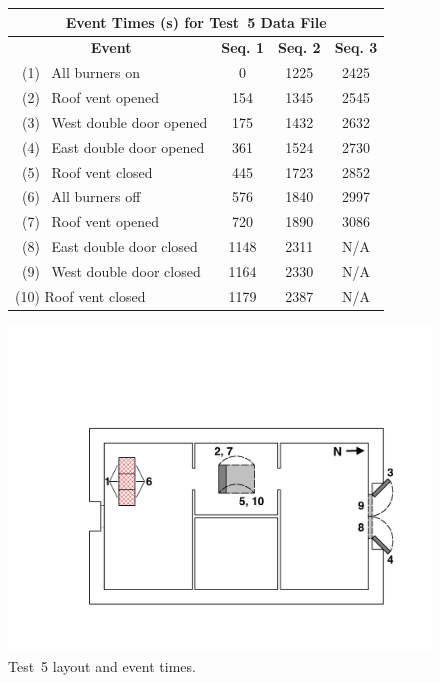 \documentclass[12pt,oneside]{book}
\begin{document}
\begin{figure}[!ht]
\begin{minipage}[b]{0.8\columnwidth}
	\begin{flushleft}
	\begin{tabular}{lccc}
	\multicolumn{4}{c}{\normalsize Event Times (s) for Test~5 Data File} \\
	\toprule
	\multicolumn{1}{c}{\textbf{Event}} 	& \textbf{Seq. 1} & \textbf{Seq. 2} & \textbf{Seq. 3} \\
	\midrule
	~(1)~ All burners on 				& 	0			  &	   1225			&	   2425		\\
	~(2)~ Roof vent opened 				&   154			  &    1345			&	   2545		\\
	~(3)~ West double door opened 		&	175			  &	   1432	 		&	   2632 	\\
	~(4)~ East double door opened 		&   361			  &    1524			&	   2730		\\
	~(5)~ Roof vent closed		 		&   445			  &    1723			&	   2852		\\
	~(6)~ All burners off 				&   576			  &    1840			&	   2997		\\
	~(7)~ Roof vent opened				& 	720 		  &	   1890			&	   3086		\\
	~(8)~ East double door closed		& 	1148 		  &	   2311			&	   N/A		\\
	~(9)~ West double door closed		& 	1164 		  &	   2330			&	   N/A		\\
	(10) Roof vent closed		 		&   1179		  &    2387			&	   N/A		\\
	\bottomrule
	\end{tabular}
	\end{flushleft}
\end{minipage}
\begin{minipage}[b]{0.9\columnwidth}
	\vspace{15pt}
	\centering
	\includegraphics[width=0.86\columnwidth]{../Figures/Floor_Plans/East_Structure_Test_5}
\end{minipage}
\caption{Test~5 layout and event times.}
\label{fig:east_test_5}
\end{figure}
\end{document}
